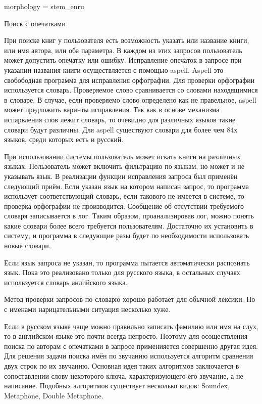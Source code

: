 morphology = stem\_enru


Поиск с опечатками

При поиске книг у пользователя есть возможность указать или название книги, или имя автора, или оба параметра. В каждом из этих запросов пользователь может допустить опечатку или ошибку.
Исправление опечаток в запросе при указании названия книги осуществляется с помощью aspell. 
Aspell это свобободная программа для исправления орфографии.
Для проверки орфографии используется словарь. 
Проверяемое слово сравнивается со словами находящимися в словаре.
В случае, если проверяемо слово определено как не правельное, aspell может предложить варинты исправления. Так как в основе механизма испарвления слов лежит словарь, то очевидно для различных языков такие словари будут различны. Для aspell существуют словари для более чем 84х языков,
среди которых есть и русский.

При использовании системы пользователь может искать книги на различных языках. Пользователь может включить фильтрацию по языкам, но может и не указывать язык.
В реализации функции исправления запроса был применён следующий приём.
Если указан язык на котором написан запрос, то программа использует соответствующий словарь, если такового не имеется в системе, то проверка орфографии не производится. Сообщение об отсутствии требуемого словаря записывается в лог.
Таким образом, проанализировав лог, можно понять какие словари более всего требуется пользователям. Достаточно их установить в систему, и программа в следующие разы будет по необходимости использовать новые словари.

Если язык запроса не указан, то программа пытается автоматически распознать язык.
Пока это реализовано только для русского языка, в остальных случаях используется словарь анлийского языка.

Метод проверки запросов по словарю хорошо работает для обычной лексики. Но с именами нарицательными ситуация несколько хуже.

Если в русском языке чаще можно правильно записать фамилию или имя на слух, то в английском языке это почти всегда непросто.
Поэтому для осоществления поиска по авторам с опечатками в запросе применияется совершенно другая идея.
Для решения задачи поиска имён по звучанию используется алгоритм сравнения двух строк по их звучанию.
Основная идея таких алгоритмов заключается в сопоставлении слову некоторого ключа, характеризующего его звучание, а не написание.
Подобных алгоритмов существует несколько видов: Soundex, Metaphone, Double Metaphone.

